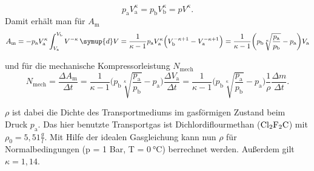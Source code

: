 \begin{equation}
p_\text{a}V^\kappa_\text{a} = p_\text{b}V^\kappa_\text{b} = pV^\kappa.
\end{equation}
Damit erhält man für $A_\text{m}$
\begin{equation}
A_\text{m} = - p_\text{a}V^\kappa_\text{a}\int_{V_\text{a}}^{V_\text{b}} V^{-\kappa} \, \symup{d}V = \frac{1}{\kappa-1}p_\text{a}V^\kappa_\text{a}\Bigl(V^{-\kappa+1}_\text{b}-V^{-\kappa+1}_\text{a}\Bigr) = \frac{1}{\kappa-1}\biggl(p_\text{b}\sqrt[\kappa]{\frac{p_\text{a}}{p_\text{b}}} - p_\text{a}\biggr) V_\text{a}
\end{equation}

und für die mechanische Kompressorleistung $N_\text{mech}$
\begin{equation}
N_\text{mech} = \frac{\Delta A_\text{m}}{\Delta t} = \frac{1}{\kappa-1}\biggl(p_\text{b}\sqrt[\kappa]{\frac{p_\text{a}}{p_\text{b}}} - p_\text{a}\biggr) \frac{\Delta V_\text{a}}{\Delta t} = \frac{1}{\kappa-1}\biggl(p_\text{b}\sqrt[\kappa]{\frac{p_\text{a}}{p_\text{b}}} - p_\text{a}\biggr) \frac{1}{\rho} \frac{\Delta m}{\Delta t}.
\end{equation}

$\rho$ ist dabei die Dichte des Transportmediums im gasförmigen Zustand beim Druck $p_\text{a}$.
Das hier benutzte Transportgas ist Dichlordiflourmethan ($\ce{Cl2F2C}$) mit $\rho_0 = 5,51\frac{g}{l}$. 
Mit Hilfe der idealen Gasgleichung kann nun $\rho$ für Normalbedingungen (p = 1 Bar, T = $\SI{0}{\celsius}$) berrechnet werden.
Außerdem gilt $\kappa=1,14$.

